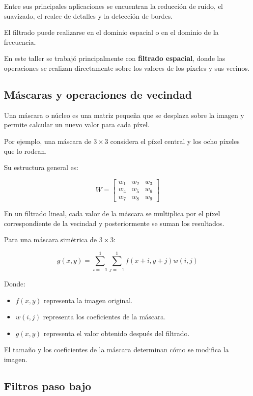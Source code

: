 \documentclass[11pt,letterpaper]{article}
\begin{document}
Entre sus principales aplicaciones se encuentran
la reducción de ruido, el suavizado, el realce de
detalles y la detección de bordes.

El filtrado puede realizarse en el dominio espacial
o en el dominio de la frecuencia.

En este taller se trabajó principalmente con
\textbf{filtrado espacial}, donde las operaciones se
realizan directamente sobre los valores de los píxeles
y sus vecinos.

\subsection{Máscaras y operaciones de vecindad}

Una máscara o núcleo es una matriz pequeña que se
desplaza sobre la imagen y permite calcular un nuevo
valor para cada píxel.

Por ejemplo, una máscara de $3\times3$ considera
el píxel central y los ocho píxeles que lo rodean.

Su estructura general es:

\[
W =
\begin{bmatrix}
w_1 & w_2 & w_3\\
w_4 & w_5 & w_6\\
w_7 & w_8 & w_9
\end{bmatrix}
\]

En un filtrado lineal, cada valor de la máscara
se multiplica por el píxel correspondiente
de la vecindad y posteriormente se suman
los resultados.

Para una máscara simétrica de $3\times3$:

\[
g(x,y)=
\sum_{i=-1}^{1}
\sum_{j=-1}^{1}
f(x+i,y+j)w(i,j)
\]

Donde:

\begin{itemize}

    \item $f(x,y)$ representa la imagen original.
    \item $w(i,j)$ representa los coeficientes de la máscara.
    \item $g(x,y)$ representa el valor obtenido
    después del filtrado.

\end{itemize}

El tamaño y los coeficientes de la máscara
determinan cómo se modifica la imagen.

\subsection{Filtros paso bajo}
\end{document}
